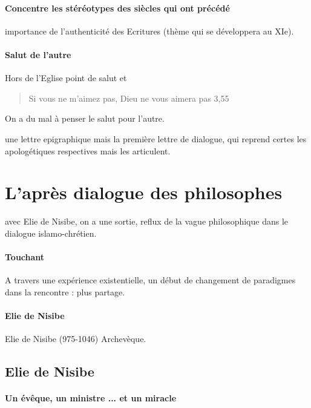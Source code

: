 \paragraph{Concentre les stéréotypes des siècles qui ont précédé} importance de l'authenticité des Ecritures (thème qui se développera au XIe).

\paragraph{Salut de l'autre}
Hors de l'Eglise point de salut et 
\begin{quote}
    Si vous ne m'aimez pas, Dieu ne vous aimera pas 3,55
\end{quote}
On a du mal à penser le salut pour l'autre.

\begin{Synthesis}
    une lettre epigraphique mais la première lettre de dialogue, qui reprend certes les apologétiques respectives mais les articulent.
\end{Synthesis}
\section{L'après dialogue des philosophes}


avec Elie de Nisibe, on a une sortie, reflux de la vague philosophique dans le dialogue islamo-chrétien.

\paragraph{Touchant} A travers une expérience existentielle, un début de changement de paradigmes dans la rencontre  : plus partage. 

\paragraph{Elie de Nisibe} Elie de Nisibe (975-1046) Archevèque. 
\subsection{Elie de Nisibe}
    

\paragraph{Un évêque, un ministre ...
et un miracle}


